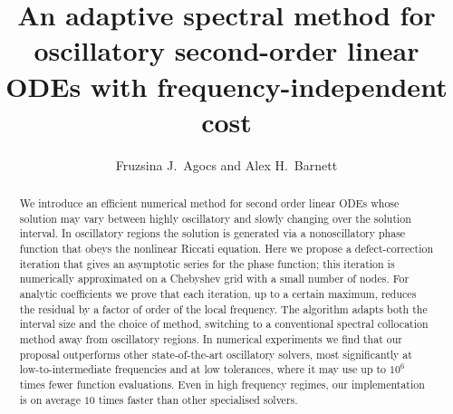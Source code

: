 \documentclass[10pt]{article}
\begin{document}
\title{An adaptive spectral method for oscillatory second-order linear ODEs with frequency-independent cost }

\author{Fruzsina J.\ Agocs and Alex H.\ Barnett}
\maketitle

\begin{abstract}



We introduce an efficient numerical method for second order linear ODEs whose
solution may vary between highly oscillatory and slowly changing over the solution interval.
%
In oscillatory regions the solution is generated via a nonoscillatory phase
function that obeys the nonlinear Riccati equation. Here we propose a
defect-correction iteration that gives an asymptotic series for the phase
function; this iteration is numerically approximated on a Chebyshev grid with a small number of nodes.
%
For analytic coefficients we prove that each iteration, up to a certain
maximum, reduces the residual by a factor of order of the local frequency. 
%
The algorithm adapts both the interval size and the choice of method,
switching to a conventional spectral collocation method away from
oscillatory regions.
%
In numerical experiments we find that our proposal outperforms other state-of-the-art
oscillatory solvers, most significantly at low-to-intermediate
frequencies and at low tolerances, where it may use up to $10^6$
times fewer function evaluations.  Even in high frequency regimes, our
implementation is
on average $10$ times faster than other specialised solvers.
\end{abstract}
\end{document}
